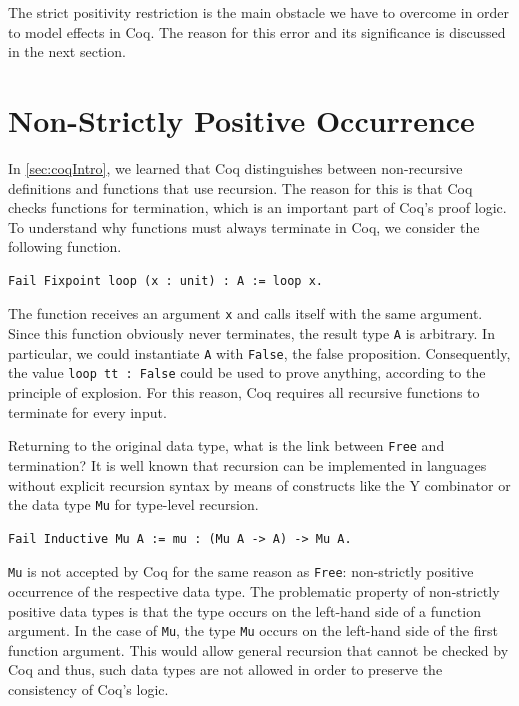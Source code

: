 \documentclass[a4paper, 11pt, fleqn, twoside, abstract=on]{scrreprt}
\newcommand{\cinl}[1]{\texttt{#1}}
\begin{document}
The strict positivity restriction is the main obstacle we have to overcome in order to model effects in Coq.
The reason for this error and its significance is discussed in the next section.

\section{Non-Strictly Positive Occurrence}
\label{sec:non-strictly}

In \autoref{sec:coqIntro}, we learned that Coq distinguishes between non-recursive definitions and functions that use recursion.
The reason for this is that Coq checks functions for termination, which is an important part of Coq's proof logic.
To understand why functions must always terminate in Coq, we consider the following function.

\begin{verbatim}
Fail Fixpoint loop (x : unit) : A := loop x.
\end{verbatim}
\noindent
The function receives an argument \cinl{x} and calls itself with the same argument.
Since this function obviously never terminates, the result type \cinl{A} is arbitrary.
In particular, we could instantiate \cinl{A} with \cinl{False}, the false proposition.
Consequently, the value \cinl{loop tt : False} could be used to prove anything, according to the principle of explosion.
For this reason, Coq requires all recursive functions to terminate for every input.

Returning to the original data type, what is the link between \cinl{Free} and termination?
It is well known that recursion can be implemented in languages without explicit recursion syntax by means of constructs like the Y combinator or the data type \texttt{Mu} for type-level recursion.

\begin{verbatim}
Fail Inductive Mu A := mu : (Mu A -> A) -> Mu A.
\end{verbatim}

\cinl{Mu} is not accepted by Coq for the same reason as \cinl{Free}: non-strictly positive occurrence of the respective data type.
The problematic property of non-strictly positive data types is that the type occurs on the left-hand side of a function argument.
In the case of \cinl{Mu}, the type \cinl{Mu} occurs on the left-hand side of the first function argument.
This would allow general recursion that cannot be checked by Coq and thus, such data types are not allowed in order to preserve the consistency of Coq's logic.
\end{document}
